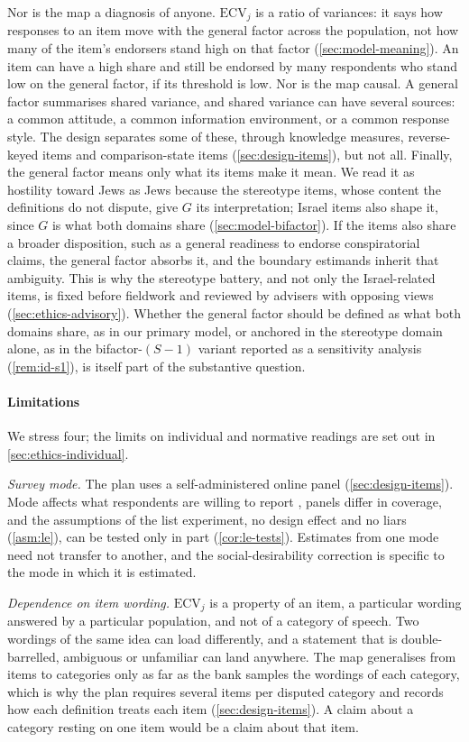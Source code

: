 Nor is the map a diagnosis of anyone. $\mathrm{ECV}_j$ is a ratio of
variances: it says how responses to an item move with the general factor
across the population, not how many of the item's endorsers stand high on
that factor (\cref{sec:model-meaning}). An item can have a high share and
still be endorsed by many respondents who stand low on the general factor,
if its threshold is low. Nor is the map causal. A general factor summarises shared variance, and shared variance can have
several sources: a common attitude, a common information environment, or a
common response style. The design separates some of these, through
knowledge measures, reverse-keyed items and comparison-state items
(\cref{sec:design-items}), but not all. Finally, the general factor means
only what its items make it mean. We read it as hostility toward Jews as
Jews because the stereotype items, whose content the definitions do not
dispute, give $G$ its interpretation; Israel items also shape it, since $G$
is what both domains share (\cref{sec:model-bifactor}). If the items also share a broader
disposition, such as a general readiness to endorse conspiratorial claims,
the general factor absorbs it, and the boundary estimands inherit that
ambiguity. This is why the stereotype battery, and not only the
Israel-related items, is fixed before fieldwork and reviewed by advisers with
opposing views (\cref{sec:ethics-advisory}). Whether the general factor
should be defined as what both domains share, as in our primary model, or
anchored in the stereotype domain alone, as in the bifactor-$(S-1)$ variant
reported as a sensitivity analysis (\cref{rem:id-s1}), is itself part of the
substantive question.

\paragraph{Limitations}
We stress four; the limits on individual and normative readings are set out in \cref{sec:ethics-individual}.

\emph{Survey mode.} The plan uses a self-administered online panel
(\cref{sec:design-items}). Mode affects what respondents are willing to
report \citep{kreuter2008,tourangeau2007}, panels differ in coverage, and the
assumptions of the list experiment, no design effect and no liars
(\cref{asm:le}), can be tested only in part (\cref{cor:le-tests}). Estimates
from one mode need not transfer to another, and the social-desirability
correction is specific to the mode in which it is estimated.

\emph{Dependence on item wording.} $\mathrm{ECV}_j$ is a property of an item,
a particular wording answered by a particular population, and not of a
category of speech. Two wordings of the same idea can load differently, and a
statement that is double-barrelled, ambiguous or unfamiliar can land
anywhere. The map generalises from items to categories only as far as the
bank samples the wordings of each category, which is why the plan requires
several items per disputed category and records how each definition treats
each item (\cref{sec:design-items}). A claim about a category resting on one
item would be a claim about that item.

